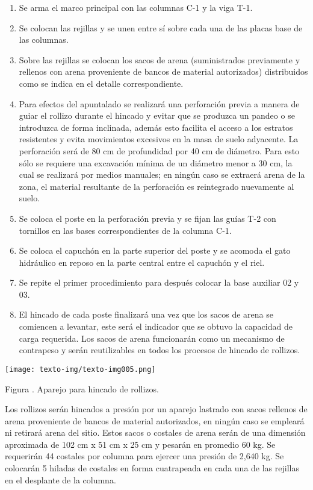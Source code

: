 \documentclass{article}
\newcounter{Figura}
\renewcommand\theFigura{\arabic{Figura}}
\begin{document}
\begin{enumerate}
\item Se arma el marco principal con las columnas C-1 y la viga T-1.
\item Se colocan las rejillas y se unen entre sí sobre cada una de las placas base de las columnas.
\item Sobre las rejillas se colocan los sacos de arena (suministrados previamente y rellenos con arena proveniente de bancos de material autorizados) distribuidos como se indica en el detalle correspondiente.
\item Para efectos del apuntalado se realizará una perforación previa a manera de guiar el rollizo durante el hincado y evitar que se produzca un pandeo o se introduzca de forma inclinada, además esto facilita el acceso a los estratos resistentes y evita movimientos excesivos en la masa de suelo adyacente. La perforación será de 80 cm de profundidad por 40 cm de diámetro. Para esto sólo se requiere una excavación mínima de un diámetro menor a 30 cm, la cual se realizará por medios manuales; en ningún caso se extraerá arena de la zona, el material resultante de la perforación es reintegrado nuevamente al suelo.
\item Se coloca el poste en la perforación previa y se fijan las guías T-2 con tornillos en las bases correspondientes de la columna C-1.
\item Se coloca el capuchón en la parte superior del poste y se acomoda el gato hidráulico en reposo en la parte central entre el capuchón y el riel.
\item Se repite el primer procedimiento para después colocar la base auxiliar 02 y 03.
\item El hincado de cada poste finalizará una vez que los sacos de arena se comiencen a levantar, este será el indicador que se obtuvo la capacidad de carga requerida. Los sacos de arena funcionarán como un mecanismo de contrapeso y serán reutilizables en todos los procesos de hincado de rollizos.
\end{enumerate}
 \texttt{[image: texto-img/texto-img005.png]} 

Figura \stepcounter{Figura}{\theFigura}. Aparejo para hincado de rollizos.


\bigskip


\bigskip

Los rollizos serán hincados a presión por un aparejo lastrado con sacos rellenos de arena proveniente de bancos de material autorizados, en ningún caso se empleará ni retirará arena del sitio. Estos sacos o costales de arena serán de una dimensión aproximada de 102 cm x 51 cm x 25 cm y pesarán en promedio 60 kg. Se requerirán 44 costales por columna para ejercer una presión de 2,640 kg. Se colocarán 5 hiladas de costales en forma cuatrapeada en cada una de las rejillas en el desplante de la columna.
\end{document}

